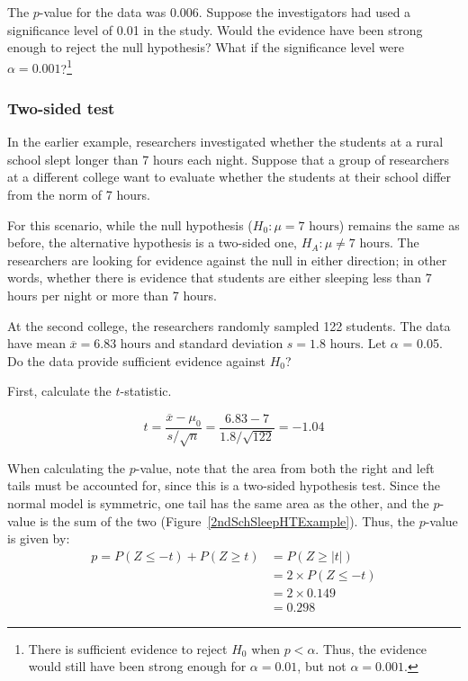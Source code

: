 \begin{spacing}{1.5}
\begin{exercise}
The $p$-value for the data was 0.006. Suppose the investigators had used a significance level of 0.01 in the study. Would the evidence have been strong enough to reject the null hypothesis? What if the significance level were $\alpha = 0.001$?\footnote{There is sufficient evidence to reject $H_{0}$ when $p < \alpha$. Thus, the evidence would still have been strong enough for $\alpha = 0.01$, but not $\alpha = 0.001$.}
\end{exercise}

\subsubsection{Two-sided test}

In the earlier example, researchers investigated whether the students at a rural school slept longer than 7 hours each night. Suppose that a group of researchers at a different college want to evaluate whether the students at their school differ from the norm of 7 hours. 

For this scenario, while the null hypothesis ($H_0: \mu = 7 \text{ hours}$) remains the same as before, the alternative hypothesis is a two-sided one, $H_A: \mu \neq 7\text{ hours}$. The researchers are looking for evidence against the null in either direction; in other words, whether there is evidence that students are either sleeping less than 7 hours per night or more than 7 hours. 

\begin{example}{At the second college, the researchers randomly sampled 122 students. The data have mean $\overline{x} = 6.83 \text{ hours}$ and standard deviation $s = 1.8 \text{ hours}$. Let $\alpha$ = 0.05. Do the data provide sufficient evidence against $H_0$?} 
	
	First, calculate the $t$-statistic. 
	
	\[t=\frac{\overline{x}-\mu_0}{s/\sqrt{n}} = \frac{6.83 - 7}{1.8 / \sqrt{122}} = -1.04\]
	
	When calculating the $p$-value, note that the area from both the right and left tails must be accounted for, since this is a two-sided hypothesis test. Since the normal model is symmetric, one tail has the same area as the other, and the $p$-value is the sum of the two (Figure~\ref{2ndSchSleepHTExample}). Thus, the $p$-value is given by:
	\begin{align*}
	p = P(Z \leq -t) + P(Z \geq t) &= P(Z \geq |t|) \\
		&= 2 \times P(Z \leq -t) \\
		&= 2 \times 0.149 \\
		&= 0.298
	\end{align*}


\end{example}
\end{spacing}
